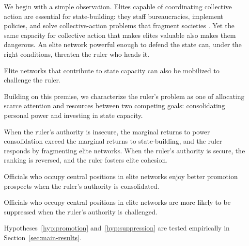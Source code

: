 
We begin with a simple observation. Elites capable of coordinating collective
action are essential for state-building: they staff bureaucracies, implement
policies, and solve collective-action problems that fragment societies
\citep{author2020example,author2018book}. Yet the same capacity for collective
action that makes elites valuable also makes them dangerous. An elite network
powerful enough to defend the state can, under the right conditions, threaten
the ruler who heads it.

\begin{assumption}
Elite networks that contribute to state capacity can also be mobilized to
challenge the ruler.
\end{assumption}

Building on this premise, we characterize the ruler's problem as one of
allocating scarce attention and resources between two competing goals:
consolidating personal power and investing in state capacity.

\begin{proposition}
When the ruler's authority is insecure, the marginal returns to power
consolidation exceed the marginal returns to state-building, and the ruler
responds by fragmenting elite networks. When the ruler's authority is
secure, the ranking is reversed, and the ruler fosters elite cohesion.
\end{proposition}

\begin{hypothesis}[Promotion]
Officials who occupy central positions in elite networks enjoy better
promotion prospects when the ruler's authority is consolidated.
\label{hyp:promotion}
\end{hypothesis}

\begin{hypothesis}[Suppression]
Officials who occupy central positions in elite networks are more likely to
be suppressed when the ruler's authority is challenged.
\label{hyp:suppression}
\end{hypothesis}

Hypotheses~\ref{hyp:promotion} and~\ref{hyp:suppression} are tested
empirically in Section~\ref{sec:main-results}.
